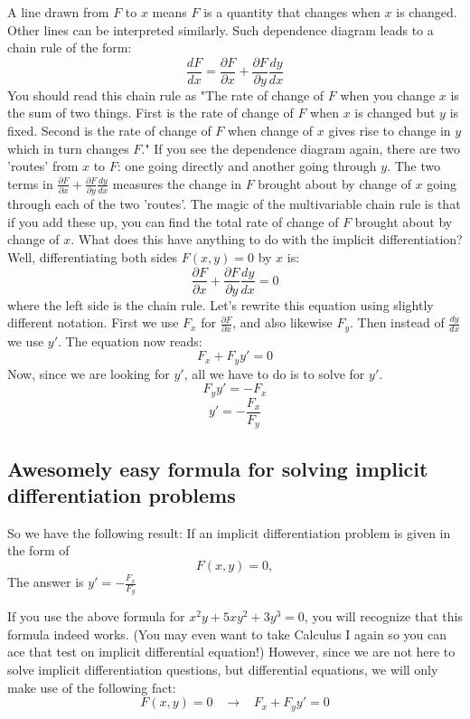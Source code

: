 \documentclass[12pt]{report}
\begin{document}
A line drawn from $F$ to $x$ means $F$ is a quantity that changes when $x$ is changed. Other lines can be interpreted similarly. Such dependence diagram leads to a chain rule of the form:
$$\frac{dF}{dx} = \frac{\partial F}{\partial x} + \frac{\partial F}{\partial y} \frac{dy}{dx}$$
You should read this chain rule as "The rate of change of $F$ when you change $x$ is the sum of two things. First is the rate of change of $F$ when $x$ is changed but $y$ is fixed. Second is the rate of change of $F$ when change of $x$ gives rise to change in $y$ which in turn changes $F$." If you see the dependence diagram again, there are two 'routes' from $x$ to $F$: one going directly and another going through $y$. The two terms in $\frac{\partial F}{\partial x} + \frac{\partial F}{\partial y} \frac{dy}{dx}$ measures the change in $F$ brought about by change of $x$ going through each of the two 'routes'. The magic of the multivariable chain rule is that if you add these up, you can find the total rate of change of $F$ brought about by change of $x$.
What does this have anything to do with the implicit differentiation? Well, differentiating both sides $F(x,y)=0$ by $x$ is:
$$\frac{\partial F}{\partial x} + \frac{\partial F}{\partial y} \frac{dy}{dx} =0 $$
where the left side is the chain rule. Let's rewrite this equation using slightly different notation. First we use $F_x$ for $\frac{\partial F}{\partial x}$, and also likewise $F_y$. Then instead of $\frac{dy}{dx}$ we use $y'$. The equation now reads:
$$F_x + F_y y'=0$$
Now, since we are looking for $y'$, all we have to do is to solve for $y'$.
$$ F_y y'= - F_x$$
$$ y' = - \frac{F_x}{F_y} $$

\subsection*{Awesomely easy formula for solving implicit differentiation problems }
So we have the following result: If an implicit differentiation problem is given in the form of
$$F(x,y)=0,$$
The answer is $ y' = - \frac{F_x}{F_y} $

If you use the above formula for $x^2 y +5xy^2 +3y^3 =0 $, you will recognize that this formula indeed works. (You may even want to take Calculus I again so you can ace that test on implicit differential equation!) However, since we are not here to solve implicit differentiation questions, but differential equations, we will only make use of the following fact:
$$F(x,y)=0 \; \; \; \rightarrow \; \; \; F_x + F_y y'=0$$
\end{document}
